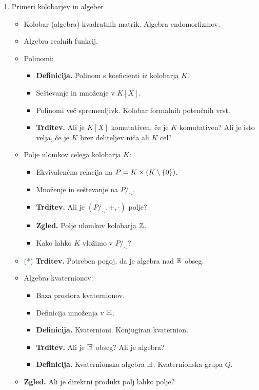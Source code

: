 \begin{enumerate}
    \item Primeri kolobarjev in algeber
    \begin{itemize}
        \item Kolobar (algebra) kvadratnih matrik. Algebra endomorfizmov.
        \item Algebra realnih funkcij.
        \item Polinomi:
        \begin{itemize}
            \item \textbf{Definicija.} Polinom s koeficienti iz kolobarja \(K\).
            \item Seštevanje in množenje v \(K[X]\).
            \item Polinomi več spremenljivk. Kolobar formalnih potenčnih vrst.
            \item \textbf{Trditev.} Ali je \(K[X]\) komutativen, če je \(K\) komutativen? Ali je isto velja, če je \(K\) brez deliteljev niča ali \(K\) cel?
        \end{itemize}
        \item Polje ulomkov celega kolobarja \(K\):
        \begin{itemize}
            \item Ekvivalenčna relacija na \(P = K \times (K \setminus \{0\})\).
            \item Množenje in seštevanje na \(P/_\sim\).
            \item \textbf{Trditev.} Ali je \((P/_\sim, +, \cdot)\) polje?
            \item \textbf{Zgled.} Polje ulomkov kolobarja \(\mathbb{Z}\).
            \item Kako lahko \(K\) vložimo v \(P/_\sim\)?
        \end{itemize}
        \item \textcolor{green}{(*)} \textbf{Trditev.} Potreben pogoj, da je algebra nad \(\mathbb{R}\) obseg.
        \item Algebra kvaternionov:
        \begin{itemize}
            \item Baza prostora kvaternionov.
            \item Definicija množenja v \(\mathbb{H}\).
            \item \textbf{Definicija.} Kvaternioni. Konjugiran kvaternion.
            \item \textbf{Trditev.} Ali je \(\mathbb{H}\) obseg? Ali je algebra?
            \item \textbf{Definicija.} Kvaternionska algebra \(\mathbb{H}\). Kvaternionska grupa \(Q\).
        \end{itemize}
        \item \textbf{Zgled.} Ali je direktni produkt polj lahko polje?
    \end{itemize}


\end{enumerate}
